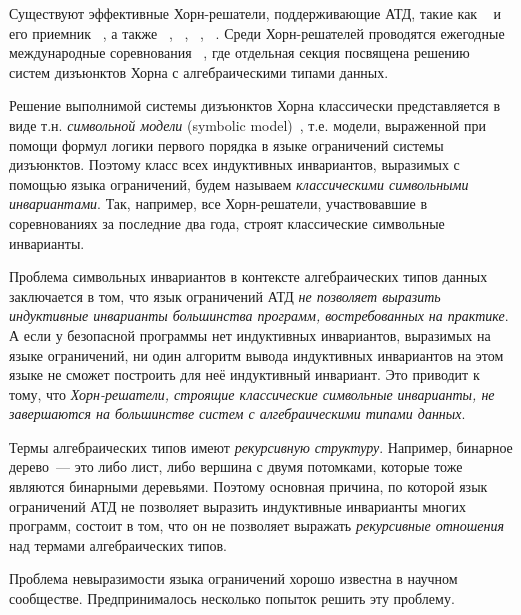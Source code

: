 Существуют эффективные Хорн-решатели, поддерживающие АТД, такие как \spacer{}~\cite{komuravelli2016smt} и его приемник \racer{}~\cite{10.1145/3498722}, а также \eldarica{}~\cite{8603013}, \hoice{}~\cite{10.1007/978-3-030-02768-1_8}, \rchc{}~\cite{haude2020}, \vericat{}~\cite{de_angelis_proietti_fioravanti_pettorossi_2022}.
Среди Хорн-решателей проводятся ежегодные международные соревнования \chccomp{}~\cite{De_Angelis_2022}, где отдельная секция посвящена решению систем дизъюнктов Хорна с алгебраическими типами данных.

Решение выполнимой системы дизъюнктов Хорна классически представляется в виде т.\:н. \emph{символьной модели} (symbolic model)~\cite{Bjorner2015}, т.\:е. модели, выраженной при помощи формул логики первого порядка в языке ограничений системы дизъюнктов.
Поэтому класс всех индуктивных инвариантов, выразимых с помощью языка ограничений, будем называем \emph{классическими символьными инвариантами}.
Так, например, все Хорн-решатели, участвовавшие в соревнованиях \chccomp{} за последние два года, строят классические символьные инварианты.

Проблема символьных инвариантов в контексте алгебраических типов данных заключается в том, что язык ограничений АТД \emph{не позволяет выразить индуктивные инварианты большинства программ, востребованных на практике}.
А если у безопасной программы нет индуктивных инвариантов, выразимых на языке ограничений, ни один алгоритм вывода индуктивных инвариантов на этом языке не сможет построить для неё индуктивный инвариант. 
Это приводит к тому, что \emph{Хорн-решатели, строящие классические символьные инварианты, не завершаются на большинстве систем с алгебраическими типами данных}.

Термы алгебраических типов имеют \emph{рекурсивную структуру}. Например, бинарное дерево~--- это либо лист, либо вершина с двумя потомками, которые тоже являются бинарными деревьями.
Поэтому основная причина, по которой язык ограничений АТД не позволяет выразить индуктивные инварианты многих программ, состоит в том, что он не позволяет выражать \emph{рекурсивные отношения} над термами алгебраических типов.

{\progress} Проблема невыразимости языка ограничений хорошо известна в научном сообществе. Предпринималось несколько попыток решить эту проблему.

